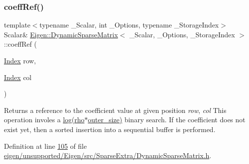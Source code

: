 \mbox{\label{class_eigen_1_1_dynamic_sparse_matrix_a17093cd39bd0e6ebd6250bc5feb61a0f}} 
\subsubsection{\texorpdfstring{coeff\+Ref()}{coeffRef()}\hspace{0.1cm}{\footnotesize\ttfamily [1/2]}}
{\footnotesize\ttfamily template$<$typename \+\_\+\+Scalar, int \+\_\+\+Options, typename \+\_\+\+Storage\+Index$>$ \\
Scalar\& \hyperlink{class_eigen_1_1_dynamic_sparse_matrix}{Eigen\+::\+Dynamic\+Sparse\+Matrix}$<$ \+\_\+\+Scalar, \+\_\+\+Options, \+\_\+\+Storage\+Index $>$\+::coeff\+Ref (\begin{DoxyParamCaption}\item[{\hyperlink{group___core___module_a554f30542cc2316add4b1ea0a492ff02}{Index}}]{row,  }\item[{\hyperlink{group___core___module_a554f30542cc2316add4b1ea0a492ff02}{Index}}]{col }\end{DoxyParamCaption})\hspace{0.3cm}{\ttfamily [inline]}}

\begin{DoxyReturn}{Returns}
a reference to the coefficient value at given position {\itshape row}, {\itshape col} This operation involes a \hyperlink{structlog}{log(rho$\ast$outer\+\_\+size)} binary search. If the coefficient does not exist yet, then a sorted insertion into a sequential buffer is performed. 
\end{DoxyReturn}


Definition at line \hyperlink{eigen_2unsupported_2_eigen_2src_2_sparse_extra_2_dynamic_sparse_matrix_8h_source_l00105}{105} of file \hyperlink{eigen_2unsupported_2_eigen_2src_2_sparse_extra_2_dynamic_sparse_matrix_8h_source}{eigen/unsupported/\+Eigen/src/\+Sparse\+Extra/\+Dynamic\+Sparse\+Matrix.\+h}.

\mbox{\label{class_eigen_1_1_dynamic_sparse_matrix_a17093cd39bd0e6ebd6250bc5feb61a0f}} 
